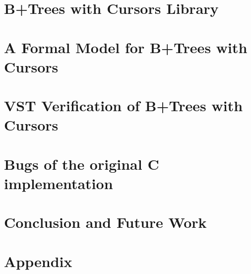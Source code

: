 \documentclass{llncs2e/llncs}
\begin{document}
\section{B+Trees with Cursors Library}
\label{sec:btrees}


\section{A Formal Model for B+Trees with Cursors}
\label{sec:model}


\section{VST Verification of B+Trees with Cursors}
\label{sec:verif}


\section{Bugs of the original C implementation}
\label{sec:bugs}


\section{Conclusion and Future Work}
\label{sec:conclusion}


\newpage
{}
\nocite{*}



\section{Appendix}
\label{sec:appendix}

\end{document}
